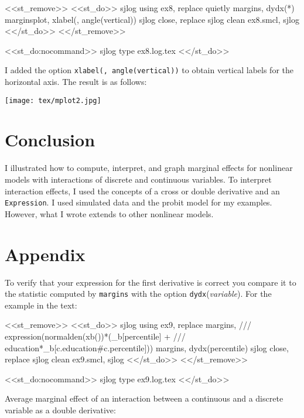 \documentclass[11pt]{article}
\begin{document}
<<st_remove>>
<<st_do>>
sjlog using ex8, replace 
quietly margins, dydx(*)
marginsplot, xlabel(, angle(vertical))
sjlog close, replace 
sjlog clean ex8.smcl, sjlog 
<</st_do>>
<</st_remove>>

\begin{stlog}[auto]
<<st_do:nocommand>>
sjlog type ex8.log.tex
<</st_do>>
\end{stlog}

I added the option \texttt{xlabel(, angle(vertical))} to obtain vertical labels for the horizontal axis. The result is as follows:

\begin{center}
\begin{centering}
\texttt{[image: tex/mplot2.jpg]}
\end{centering}
\end{center}

\section*{Conclusion}

I illustrated how to compute, interpret, and graph marginal effects for nonlinear models with interactions of discrete and continuous variables. To interpret interaction effects, I used the concepts of a cross or double derivative and an \texttt{Expression}. I used simulated data and the probit model for my examples. However, what I wrote extends to other nonlinear models. 

\section*{Appendix}

To verify that your expression for the first derivative is correct you compare it to the statistic computed by \texttt{margins} with the option \texttt{dydx}(\textit{variable}). For the example in the text: 

<<st_remove>>
<<st_do>>
sjlog using ex9, replace 
margins,                                            ///
    expression(normalden(xb())*(_b[percentile] +    ///
    education*_b[c.education#c.percentile]))    
margins, dydx(percentile)
sjlog close, replace 
sjlog clean ex9.smcl, sjlog 
<</st_do>>
<</st_remove>>

\begin{stlog}[auto]
<<st_do:nocommand>>
sjlog type ex9.log.tex
<</st_do>>
\end{stlog}

Average marginal effect of an interaction between a continuous and a discrete variable as a double derivative:
\end{document}
